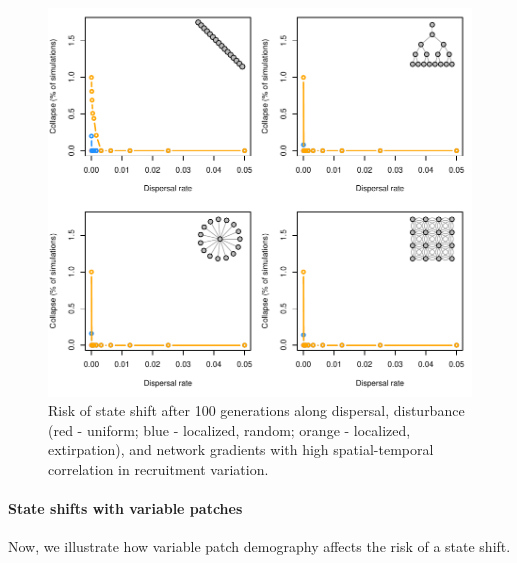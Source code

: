 \documentclass[
]{article}
\begin{document}
\begin{figure}[H]

{\centering \includegraphics{Managing_for_ecological_surprises_in_metapopulations_files/figure-latex/collapsed-1} 

}

\caption{Risk of state shift after 100 generations along dispersal, disturbance (red - uniform; blue - localized, random; orange - localized, extirpation), and network gradients with high spatial-temporal correlation in recruitment variation.}\label{fig:collapsed}
\end{figure}
\newpage

\hypertarget{state-shifts-with-variable-patches}{%
\paragraph{State shifts with variable
patches}\label{state-shifts-with-variable-patches}}

Now, we illustrate how variable patch demography affects the risk of a
state shift.
\end{document}
